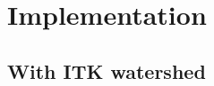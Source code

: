 \documentclass{InsightArticle}
\begin{document}
% 

\section{Implementation}
\label{sect:implementation}

  \subsection{With ITK watershed}
\end{document}
